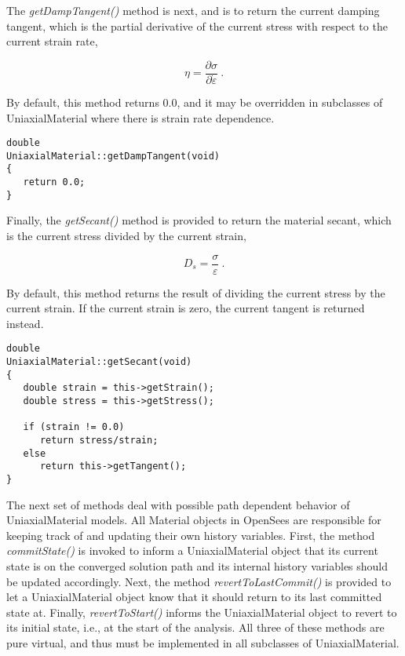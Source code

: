 \documentclass[12pt]{article}
\begin{document}
The {\em getDampTangent()} method is next, and is to return the current damping tangent, which is
the partial derivative of the current stress with respect to the current strain rate,

\begin{equation}
 \eta = \frac{\partial{\sigma}}{\partial{\dot{\varepsilon}}} \: .
\end{equation}

\noindent By default, this method returns $0.0$, and it may be overridden in subclasses of
UniaxialMaterial where there is strain rate dependence.

{\sf\small
\begin{verbatim}
double
UniaxialMaterial::getDampTangent(void)
{
   return 0.0;
}
\end{verbatim}
}

Finally, the {\em getSecant()} method is provided to return the material secant, which
is the current stress divided by the current strain,

\begin{equation}
 D_s = \frac{\sigma}{\varepsilon} \: .
\end{equation}

\noindent By default, this method returns the result of dividing the current stress
by the current strain.  If the current strain is zero, the current tangent is returned
instead.

{\sf\small
\begin{verbatim}
double
UniaxialMaterial::getSecant(void)
{
   double strain = this->getStrain();
   double stress = this->getStress();

   if (strain != 0.0)
      return stress/strain;
   else
      return this->getTangent();
}
\end{verbatim}
}

The next set of methods deal with possible path dependent behavior of UniaxialMaterial models.
All Material objects in OpenSees are responsible for keeping track of and updating their
own history variables. First, the method {\em commitState()} is invoked to inform a
UniaxialMaterial object that its current state is on the converged solution path and
its internal history variables should be updated accordingly. Next, the method
{\em revertToLastCommit()} is provided to let a UniaxialMaterial object know that it
should return to its last committed state at. Finally, {\em revertToStart()} informs the
UniaxialMaterial object to revert to its initial state, i.e., at the start of
the analysis. All three of these methods are pure virtual, and thus must be implemented
in all subclasses of UniaxialMaterial.
\end{document}
